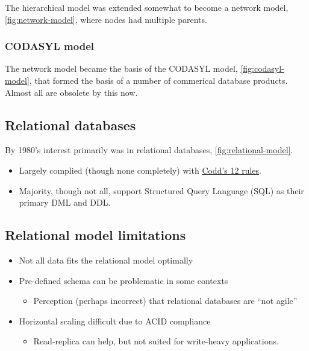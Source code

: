 \documentclass{pgnotes}
\begin{document}
The hierarchical model was extended somewhat to become a network model, \autoref{fig:network-model}, where nodes had multiple parents.


\subsubsection{CODASYL model}

The network model became the basis of the CODASYL model, \autoref{fig:codasyl-model}, that formed the basis of a number of commerical database products.
Almost all are obsolete by this now. 


\newpage
\subsection{Relational databases}

By 1980's interest primarily was in relational databases, \autoref{fig:relational-model}.


\begin{itemize}
\item Largely complied (though none completely) with \href{https://en.wikipedia.org/wiki/Codd\%27s_12_rules}{Codd's 12 rules}.
\item Majority, though not all, support Structured Query Language (SQL) as their primary DML and DDL.
\end{itemize}


\subsection{Relational model limitations}

\begin{itemize}
\item Not all data fits the relational model optimally  
\item Pre-defined schema can be problematic in some contexts
  \begin{itemize}
  \item Perception (perhaps incorrect) that relational databases are ``not agile''
  \end{itemize}
\item Horizontal scaling difficult due to ACID compliance
  \begin{itemize}
  \item Read-replica can help, but not suited for write-heavy applications.
  \end{itemize}
\end{itemize}
\end{document}

